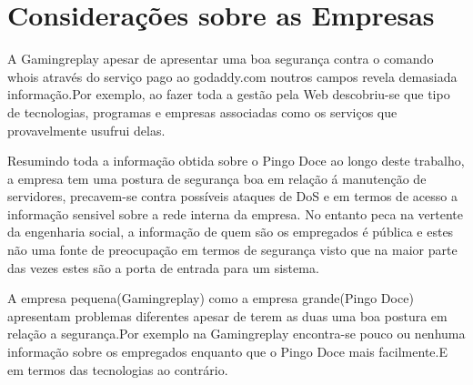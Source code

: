 \section{Considerações sobre as Empresas}

\par A Gamingreplay apesar de apresentar uma boa segurança contra o comando whois através do serviço pago ao godaddy.com noutros campos revela demasiada informação.Por exemplo, ao fazer toda a gestão pela Web descobriu-se que tipo de tecnologias, programas e empresas associadas como os serviços que provavelmente usufrui delas.

\par Resumindo toda a informação obtida sobre o Pingo Doce ao longo deste trabalho, a empresa tem uma postura de segurança boa em relação á manutenção de servidores, precavem-se contra possíveis ataques de DoS e em termos de acesso a informação sensivel sobre a rede interna da empresa. No entanto peca na vertente da engenharia social, a informação de quem são os empregados é pública e estes não uma fonte de preocupação em termos de segurança visto que na maior parte das vezes estes são a porta de entrada para um sistema.

A empresa pequena(Gamingreplay) como a empresa grande(Pingo Doce) apresentam problemas diferentes apesar de terem as duas uma boa postura em relação a segurança.Por exemplo na Gamingreplay encontra-se pouco ou nenhuma informação sobre os empregados enquanto que o Pingo Doce mais facilmente.E em termos das tecnologias ao contrário.

